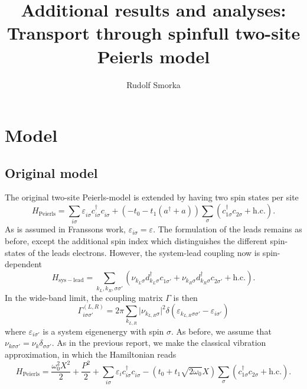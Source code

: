 \documentclass{article}
\newcommand{\pdagger}{{\phantom{\dagger}}}
\begin{document}
\title{Additional results and analyses: Transport through spinfull two-site Peierls model}
\author{Rudolf Smorka}
\maketitle
\section{Model}
\subsection{Original model}
The original two-site Peierls-model is extended by having two spin states per site
\begin{equation}
	H_\mathrm{Peierls} = \sum_{i\sigma}\varepsilon_{i\sigma}^\pdagger c_{i\sigma}^\dagger c_{i\sigma}^\pdagger + (-t_0-t_1(a^\dagger + a))\sum_\sigma (c_{1\sigma}^\dagger c_{2\sigma}^\pdagger + \mathrm{h.c.}).
\end{equation}
As is assumed in Franssons work, $\varepsilon_{i\sigma}=\varepsilon$. The formulation of the leads remains as before, except the additional spin index which distinguishes the different spin-states of the leads electrons. However, the system-lead coupling now is spin-dependent
\begin{equation}
	H_\mathrm{sys-lead} = \sum_{k_L,k_R,\sigma\sigma'} (\nu_{k_L\sigma }^\pdagger d_{k_L\sigma}^\dagger c_{1\sigma'}^\pdagger + \nu_{k_R\sigma }^\pdagger d_{k_R\sigma}^\dagger  c_{2\sigma'}^\pdagger + \mathrm{h.c.}).
\end{equation}
In the wide-band limit, the coupling matrix $\Gamma$ is then
\begin{equation}
	\Gamma_{i \sigma\sigma'}^{(L,R)} = 2\pi \sum_{k_{L,R}} \vert \nu_{k_{L,R} \sigma}\vert^2 \delta(\varepsilon_{k_{L,R}\sigma\sigma'}-\varepsilon_{i\sigma'})
\end{equation}
where $\varepsilon_{i\sigma'}$ is a system eigenenergy with spin $\sigma$. As before, we assume that $\nu_{k\sigma\sigma'} = \nu_k \delta_{\sigma\sigma'}$. 
As in the previous report, we make the classical vibration approximation, in which the Hamiltonian reads
\begin{equation}
	H_\mathrm{Peierls} = \frac{\omega_0^2 X^2}{2} + \frac{P^2}{2}  + \sum_{i\sigma } \varepsilon_i c_{i\sigma}^\dagger c_{i\sigma}^\pdagger -\left(t_0 + t_1\sqrt{2\omega_0}X\right)\sum_{\sigma}(c_{1\sigma}^\dagger c_{2\sigma}^\pdagger + \mathrm{h.c.}).
\end{equation}
\end{document}
